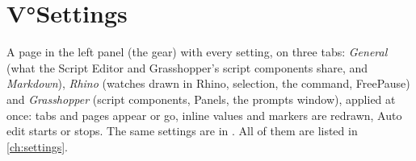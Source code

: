 \section{V°Settings}\label{sec:vsettings}

A page in the left panel (the gear) with every setting, on three tabs: \emph{General} (what the Script Editor and Grasshopper's script components share, and
\emph{Markdown}), \emph{Rhino} (watches drawn in Rhino, selection, the  command, FreePause) and
\emph{Grasshopper} (script components, Panels, the prompts window),
applied at once: tabs and pages appear or go, inline values and markers are redrawn, Auto edit starts or stops.
The same settings are in . All of them are listed in \cref{ch:settings}.
